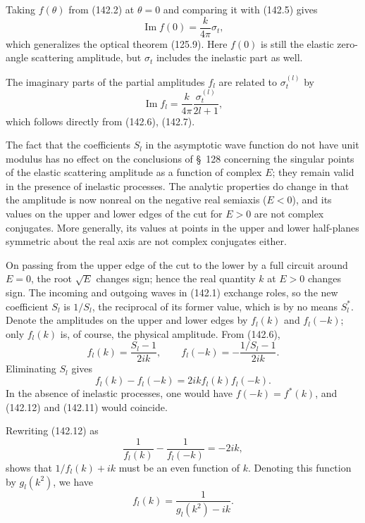 Taking $f(\theta)$ from (142.2) at $\theta=0$ and comparing it with (142.5)
gives
\begin{equation}
 \operatorname{Im}f(0)=\frac{k}{4\pi}\sigma_t,
 \tag{142.10}
\end{equation}
which generalizes the optical theorem (125.9). Here $f(0)$ is still the
elastic zero-angle scattering amplitude, but $\sigma_t$ includes the
inelastic part as well.

The imaginary parts of the partial amplitudes $f_l$ are related to
$\sigma_t^{(l)}$ by
\begin{equation}
 \operatorname{Im}f_l=\frac{k}{4\pi}\frac{\sigma_t^{(l)}}{2l+1},
 \tag{142.11}
\end{equation}
which follows directly from (142.6), (142.7).

The fact that the coefficients $S_l$ in the asymptotic wave function do not
have unit modulus has no effect on the conclusions of \S~128 concerning the
singular points of the elastic scattering amplitude as a function of complex
$E$; they remain valid in the presence of inelastic processes. The analytic
properties do change in that the amplitude is now nonreal on the negative
real semiaxis ($E<0$), and its values on the upper and lower edges of the cut
for $E>0$ are not complex conjugates. More generally, its values at points in
the upper and lower half-planes symmetric about the real axis are not complex
conjugates either.

On passing from the upper edge of the cut to the lower by a full circuit
around $E=0$, the root $\sqrt E$ changes sign; hence the real quantity $k$ at
$E>0$ changes sign. The incoming and outgoing waves in (142.1) exchange
roles, so the new coefficient $S_l$ is $1/S_l$, the reciprocal of its former
value, which is by no means $S_l^*$. Denote the amplitudes on the upper and
lower edges by $f_l(k)$ and $f_l(-k)$; only $f_l(k)$ is, of course, the
physical amplitude. From (142.6),
\[
 f_l(k)=\frac{S_l-1}{2ik},\qquad
 f_l(-k)=-\frac{1/S_l-1}{2ik}.
\]
Eliminating $S_l$ gives
\begin{equation}
 f_l(k)-f_l(-k)=2ikf_l(k)f_l(-k).
 \tag{142.12}
\end{equation}
In the absence of inelastic processes, one would have
$f(-k)=f^*(k)$, and (142.12) and (142.11) would coincide.

Rewriting (142.12) as
\[
 \frac1{f_l(k)}-\frac1{f_l(-k)}=-2ik,
\]
shows that $1/f_l(k)+ik$ must be an even function of $k$. Denoting this
function by $g_l(k^2)$, we have
\begin{equation}
 f_l(k)=\frac1{g_l(k^2)-ik}.
 \tag{142.13}
\end{equation}

